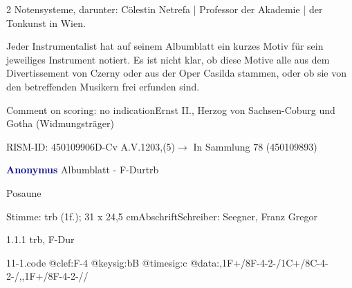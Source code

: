 \documentclass[a4paper, twocolumn, 11pt]{book}
\begin{document}
\newline %
\par 2 Notensysteme, darunter: Cölestin Netrefa | Professor der Akademie | der Tonkunst in Wien.
\par Jeder Instrumentalist hat auf seinem Albumblatt ein kurzes Motiv für sein jeweiliges Instrument notiert. Es ist nicht klar, ob diese Motive alle aus dem {\textquotedbl}Divertissement{\textquotedbl} von Czerny oder aus der Oper {\textquotedbl}Casilda{\textquotedbl} stammen, oder ob sie von den betreffenden Musikern frei erfunden sind.
\par Comment on scoring: no indication\newline Ernst II., Herzog von Sachsen-Coburg und Gotha  (Widmungsträger)
\par RISM-ID: 450109906\newline D-Cv  A.V.1203,(5)\newline $\rightarrow$ In Sammlung 78 (450109893)
      
\par \vspace{16pt} \textcolor{darkblue}{\textbf{Anonymus  }}\hfillplus{[11]}\newline Albumblatt - F-Dur\newline trb
\par \begin{itshape}[heading:] Posaune\end{itshape} 
\par \textcolor{darkblue}{}  Stimme: trb  (1f.); 31 x 24,5 cm\newline Abschrift\newline Schreiber: Seegner, Franz Gregor
\par 1.1.1  trb, F-Dur  
\begin{filecontents*}{11-1.code}
@clef:F-4
@keysig:bB
@timesig:c
@data:,1F+/8F-4-2-/1C+/8C-4-2-/,,1F+/8F-4-2-//
\end{filecontents*}
\end{document}
